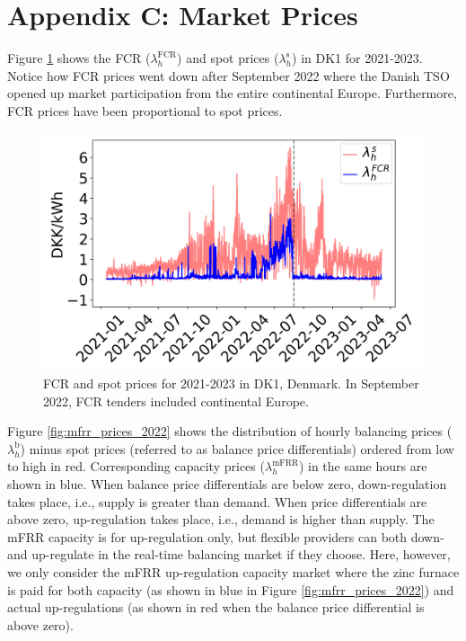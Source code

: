 \documentclass[conference]{IEEEtran}
\begin{document}
{\section*{Appendix C: Market Prices}\label{app:market-prices}


Figure \ref{fig:fcr_prices_2022} shows the FCR ($\lambda_{h}^{\text{FCR}}$) and spot prices ($\lambda_{h}^{\text{s}}$) in DK1 for 2021-2023. Notice how FCR prices went down after September 2022 where the Danish TSO opened up market participation from the entire continental Europe. Furthermore, FCR prices have been proportional to spot prices.

\begin{figure}[t]
    \centering
    \includegraphics[width=\columnwidth]{../figures/fcr_prices.png}
    \caption{FCR and spot prices for 2021-2023 in DK1, Denmark. In September 2022, FCR tenders included continental Europe.}
    \label{fig:fcr_prices_2022}
\end{figure}


Figure \ref{fig:mfrr_prices_2022} shows the distribution of hourly balancing prices ($\lambda_{h}^{\text{b}}$) minus spot prices (referred to as balance price differentials) ordered from low to high in red. Corresponding capacity prices ($\lambda_{h}^{\text{mFRR}}$) in the same hours are shown in blue. When balance price differentials are below zero, down-regulation takes place, i.e., supply is greater than demand. When price differentials are above zero, up-regulation takes place, i.e., demand is higher than supply. The mFRR capacity is for up-regulation only, but flexible providers can both down- and up-regulate in the real-time balancing market if they choose. Here, however, we only consider the mFRR up-regulation capacity market where the zinc furnace is paid for both capacity (as shown in blue in Figure \ref{fig:mfrr_prices_2022}) and actual up-regulations (as shown in red when the balance price differential is above zero).

}
\end{document}
